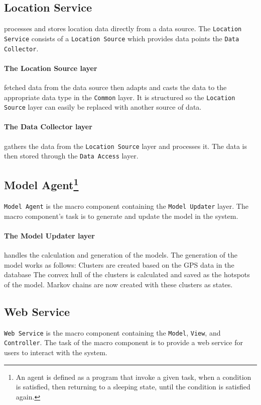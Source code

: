 \subsection*{Location Service} processes and stores location data directly from a data source. 
The \texttt{Location Service} consists of a \texttt{Location Source} which provides data points the \texttt{Data Collector}.

\paragraph{The Location Source layer} fetched data from the data source then adapts and casts the data to the appropriate data type in the \texttt{Common} layer.
It is structured so the \texttt{Location Source} layer can easily be replaced with another source of data.

\paragraph{The Data Collector layer} gathers the data from the \texttt{Location Source} layer and processes it. 
The data is then stored through the \texttt{Data Access} layer.


\subsection*{Model Agent\footnote{An agent is defined as a program that invoke a given task, when a condition is satisfied, then returning to a sleeping state, until the condition is satisfied again.\cite{definitionagent}}}\texttt{Model Agent} is the macro component containing the \texttt{Model Updater} layer.
The macro component's task is to generate and update the model in the system. 

\paragraph{The Model Updater layer} handles the calculation and generation of the models.
The generation of the model works as follows:
Clusters are created based on the GPS data in the database
The convex hull of the clusters is calculated and saved as the hotspots of the model.
Markov chains are now created with these clusters as states.

\subsection*{Web Service}\label{arch:webservice}
\texttt{Web Service} is the macro component containing the \texttt{Model}, \texttt{View}, and \texttt{Controller}.
The task of the macro component is to provide a web service for users to interact with the system.

